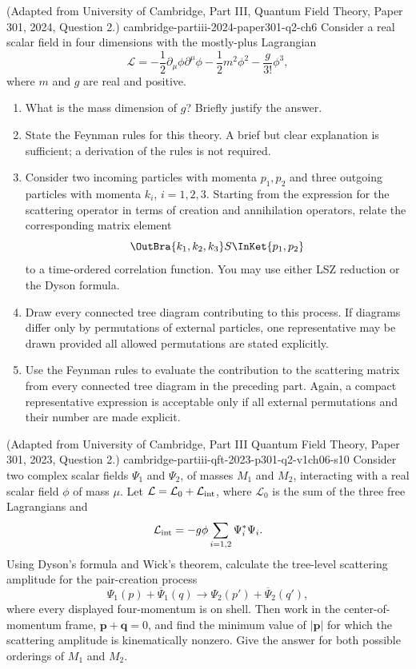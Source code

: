 \begin{enumerate}
  {(Adapted from University of Cambridge, Part III, Quantum Field Theory,
  Paper 301, 2024, Question 2.)}
  {cambridge-partiii-2024-paper301-q2-ch6}
Consider a real scalar field in four dimensions with the mostly-plus
Lagrangian
\[
 \mathcal L=-\frac12\partial_\mu\phi\partial^\mu\phi
 -\frac12m^2\phi^2-\frac{g}{3!}\phi^3,
\]
where \(m\) and \(g\) are real and positive.
\begin{enumerate}
\item
What is the mass dimension of \(g\)?  Briefly justify the answer.
\item
State the Feynman rules for this theory.  A brief but clear explanation is
sufficient; a derivation of the rules is not required.
\item
Consider two incoming particles with momenta \(p_1,p_2\) and three outgoing
particles with momenta \(k_i\), \(i=1,2,3\).  Starting from the expression
for the scattering operator in terms of creation and annihilation operators,
relate the corresponding matrix element
\[
 \OutBra{k_1,k_2,k_3}S\InKet{p_1,p_2}
\]
to a time-ordered correlation function.  You may use either LSZ reduction
or the Dyson formula.
\item
Draw every connected tree diagram contributing to this process.  If diagrams
differ only by permutations of external particles, one representative may be
drawn provided all allowed permutations are stated explicitly.
\item
Use the Feynman rules to evaluate the contribution to the scattering matrix
from every connected tree diagram in the preceding part.  Again, a compact
representative expression is acceptable only if all external permutations
and their number are made explicit.
\end{enumerate}

  {(Adapted from University of Cambridge, Part III Quantum Field Theory, Paper 301, 2023, Question 2.)}
  {cambridge-partiii-qft-2023-p301-q2-v1ch06-s10}
Consider two complex scalar fields \(\Psi_1\) and \(\Psi_2\), of masses
\(M_1\) and \(M_2\), interacting with a real scalar field \(\phi\) of
mass \(\mu\).  Let \(\mathcal L=\mathcal L_0+\mathcal L_{\rm int}\),
where \(\mathcal L_0\) is the sum of the three free Lagrangians and
\[
 \mathcal L_{\rm int}
 =-g\phi\sum_{i=1,2}\Psi_i^*\Psi_i.
\]
Using Dyson's formula and Wick's theorem, calculate the tree-level
scattering amplitude for the pair-creation process
\[
 \Psi_1(p)+\overline\Psi_1(q)
 \longrightarrow
 \Psi_2(p')+\overline\Psi_2(q'),
\]
where every displayed four-momentum is on shell.  Then work in the
center-of-momentum frame, \(\mathbf p+\mathbf q=0\), and find the minimum
value of \(|\mathbf p|\) for which the scattering amplitude is
kinematically nonzero.  Give the answer for both possible orderings of
\(M_1\) and \(M_2\).


\end{enumerate}
